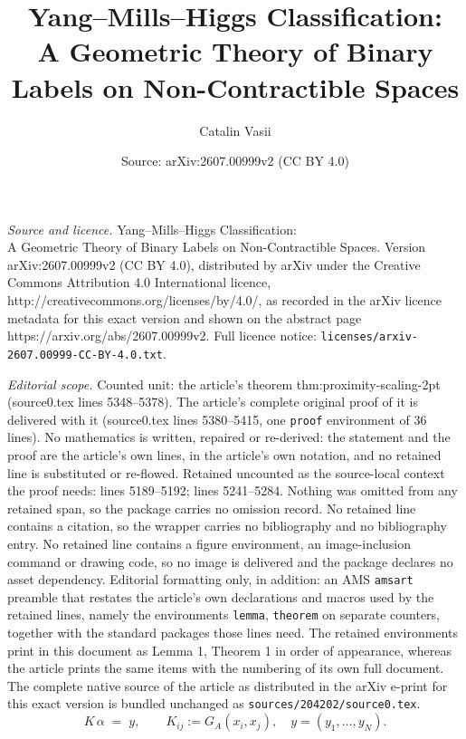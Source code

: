 \documentclass[10pt,a4paper]{amsart}
\title{Yang--Mills--Higgs Classification: \\ A Geometric Theory of Binary Labels on Non-Contractible Spaces}
\author{Catalin Vasii}
\date{Source: arXiv:2607.00999v2 (CC BY 4.0)}
\begin{document}
\maketitle

\noindent\emph{Source and licence.} Yang--Mills--Higgs Classification: \\ A Geometric Theory of Binary Labels on Non-Contractible Spaces. Version arXiv:2607.00999v2 (CC BY 4.0), distributed by arXiv under the Creative Commons Attribution 4.0 International licence, http://creativecommons.org/licenses/by/4.0/, as recorded in the arXiv licence metadata for this exact version and shown on the abstract page https://arxiv.org/abs/2607.00999v2. Full licence notice: \texttt{licenses/arxiv-2607.00999-CC-BY-4.0.txt}.\par\smallskip

\noindent\textit{Editorial scope.} Counted unit: the article's theorem thm:proximity-scaling-2pt (source0.tex lines 5348--5378). The article's complete original proof of it is delivered with it (source0.tex lines 5380--5415, one \texttt{proof} environment of 36 lines). No mathematics is written, repaired or re-derived: the statement and the proof are the article's own lines, in the article's own notation, and no retained line is substituted or re-flowed.  Retained uncounted as the source-local context the proof needs: lines 5189--5192; lines 5241--5284.  Nothing was omitted from any retained span, so the package carries no omission record.  No retained line contains a citation, so the wrapper carries no bibliography and no bibliography entry.  No retained line contains a figure environment, an image-inclusion command or drawing code, so no image is delivered and the package declares no asset dependency.  Editorial formatting only, in addition: an AMS \texttt{amsart} preamble that restates the article's own declarations and macros used by the retained lines, namely the environments \texttt{lemma}, \texttt{theorem} on separate counters, together with the standard packages those lines need.  The retained environments print in this document as Lemma 1, Theorem 1 in order of appearance, whereas the article prints the same items with the numbering of its own full document.  The complete native source of the article as distributed in the arXiv e-print for this exact version is bundled unchanged as \texttt{sources/204202/source0.tex}.
\begin{equation}\label{eq:cov-capacitance}
   K\,\alpha \;=\; y,
   \qquad K_{ij} := G_A(x_i,x_j),\quad y=(y_1,\dots,y_N).
\end{equation}
\end{document}
